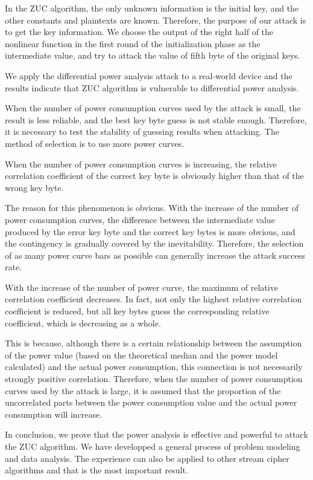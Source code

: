 \begin{bigabstract}
In the ZUC algorithm, the only unknown information is the initial key, and the other constants and plaintexts are known. Therefore, the purpose of our attack is to get the key information. We choose the output of the right half of the nonlinear function in the first round of the initialization phase as the intermediate value, and try to attack the value of fifth byte of the original keys.

We apply the differential power analysis attack to a real-world device and the results indicate that ZUC algorithm is vulnerable to differential power analysis.

When the number of power consumption curves used by the attack is small, the result is less reliable, and the best key byte guess is not stable enough. Therefore, it is necessary to test the stability of guessing results when attacking. The method of selection is to use more power curves.

When the number of power consumption curves is increasing, the relative correlation coefficient of the correct key byte is obviously higher than that of the wrong key byte.

The reason for this phenomenon is obvious. With the increase of the number of power consumption curves, the difference between the intermediate value produced by the error key byte and the correct key bytes is more obvious, and the contingency is gradually covered by the inevitability. Therefore, the selection of as many power curve bars as possible can generally increase the attack success rate.

With the increase of the number of power curve, the maximum of relative correlation coefficient decreases. In fact, not only the highest relative correlation coefficient is reduced, but all key bytes guess the corresponding relative coefficient, which is decreasing as a whole. 

This is because, although there is a certain relationship between the assumption of the power value (based on the theoretical median and the power model calculated) and the actual power consumption, this connection is not necessarily strongly positive correlation. Therefore, when the number of power consumption curves used by the attack is large, it is assumed that the proportion of the uncorrelated parts between the power consumption value and the actual power consumption will increase.

In conclusion, we prove that the power analysis is effective and powerful to attack the ZUC algorithm. We have developped a general process of problem modeling and data analysis. The experience can also be applied to other stream cipher algorithms and that is the most important result.

\end{bigabstract}